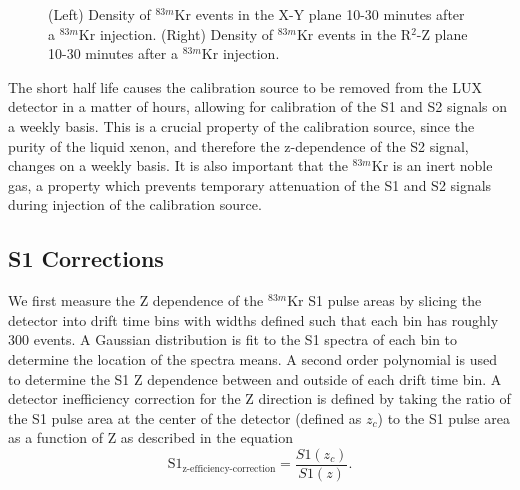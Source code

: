 \documentclass[a4paper,12pt]{article}
\begin{document}
{\begin{figure} 
\centering
{}
\qquad
{}
\caption{ (Left) Density of $^{83m}$Kr events in the X-Y plane 10-30 minutes after a $^{83m}$Kr injection. (Right) Density of $^{83m}$Kr events in the R$^2$-Z plane 10-30 minutes after a $^{83m}$Kr injection.}
\label{fig:LandauPlot}
\end{figure}

The short half life causes the calibration source to be removed from the LUX detector in a matter of hours, allowing for calibration of the S1 and S2 signals on a weekly basis.  This is a crucial property of the calibration source, since the purity of the liquid xenon, and therefore the z-dependence of the S2 signal, changes on a weekly basis.  It is also important that the $^{83m}$Kr is an inert noble gas, a property which prevents temporary attenuation of the S1 and S2 signals during injection of the calibration source. 


\subsection{S1 Corrections}

We first measure the Z dependence of the $^{83m}$Kr S1 pulse areas by slicing the detector into drift time bins with widths defined such that each bin has roughly 300 events.  A Gaussian distribution is fit to the S1 spectra of each bin to determine the location of the spectra means. A second order polynomial is used to determine the S1 Z dependence between and outside of each drift time bin. A detector inefficiency correction for the Z direction is defined by taking the ratio of the S1  pulse area at the center of the detector (defined as $z_c$) to the S1 pulse area as a function of Z as described in the equation
\begin{equation}
\mbox{S}1_{\mbox{z-efficiency-correction}} = \frac{S1(z_c)}{S1(z)}.
\end{equation} 

}
\end{document}
